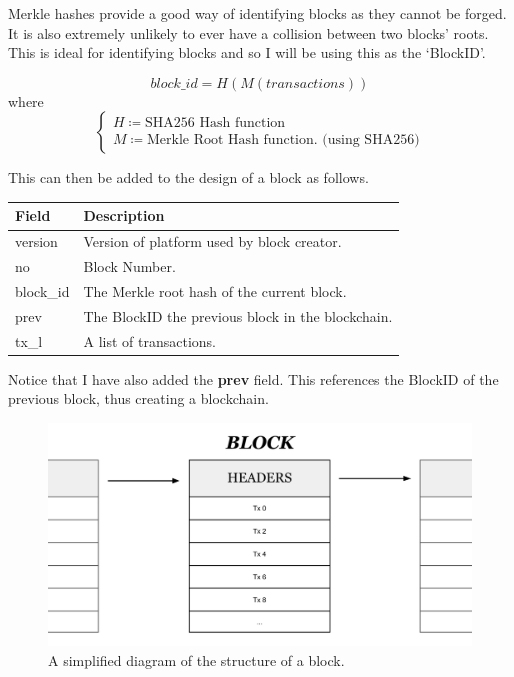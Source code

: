 \documentclass{article}
\begin{document}
Merkle hashes provide a good way of identifying blocks as they cannot be forged. It is also extremely unlikely to ever have a collision between two blocks' roots. This is ideal for identifying blocks and so I will be using this as the `BlockID'.

\[\textit{block\_id} = H(M(\textit{transactions}))\]
where
\[\begin{cases}
        H \coloneqq \textrm{SHA256 Hash function} \\[6pt]
        M \coloneqq \textrm{Merkle Root Hash function. (using SHA256)}
\end{cases}\]

\vspace{10pt}

This can then be added to the design of a block as follows.
\begin{table}[H]
\centering
\begin{tabular}{|p{2.5cm}|p{8.5cm}|}
\hline
\rowcolor{tblgrey} 
Field      & Description                                         \\ \hline
version    & Version of platform used by block creator.          \\ \hline
no         & Block Number.                                       \\ \hline
block\_id  & The Merkle root hash of the current block.          \\ \hline
prev       & The BlockID the previous block in the blockchain.   \\ \hline
tx\_l       & A list of transactions.                            \\ \hline
\end{tabular}
\end{table}

Notice that I have also added the \textbf{prev} field. This references the BlockID of the previous block, thus creating a blockchain.

\begin{figure}[h]
    \centering
    \includegraphics[width=\linewidth]{Images/Diagrams/blockchain_block.png}
    \caption{A simplified diagram of the structure of a block.}
    \label{fig:block}
\end{figure}
\end{document}

